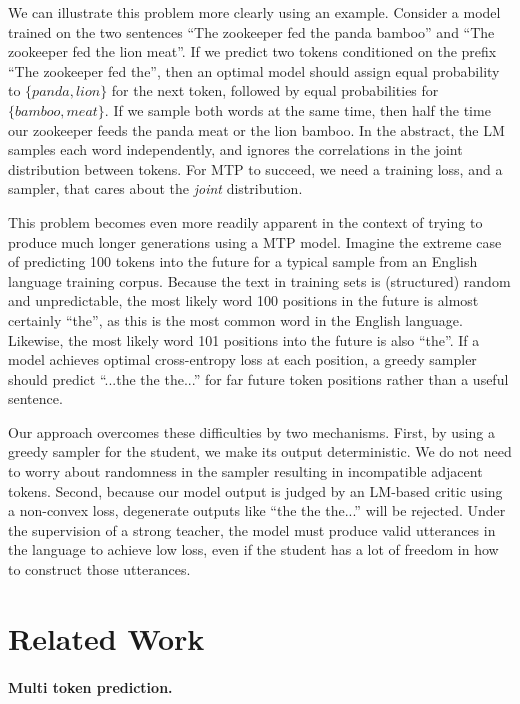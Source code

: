 \documentclass{article}
\theoremstyle{plain}
\theoremstyle{definition}
\theoremstyle{remark}
\begin{document}
We can illustrate this problem more clearly using an example. Consider a model trained on the two sentences ``The zookeeper fed the panda bamboo'' and ``The zookeeper fed the lion meat''. If we predict two tokens conditioned on the prefix ``The zookeeper fed the'', then an optimal model should assign equal probability to $\{panda, lion\}$ for the next token, followed by equal probabilities for $\{bamboo, meat\}$.  If we sample both words at the same time, then half the time our zookeeper  feeds the panda meat or the lion bamboo. In the abstract, the LM samples each word independently, and ignores the correlations in the joint distribution between tokens.  For MTP to succeed, we need a training loss, and a sampler, that cares about the {\em joint} distribution.

This problem becomes even more readily apparent in the context of trying to produce much longer generations using a MTP model.
Imagine the extreme case of predicting 100 tokens into the future for a typical sample from an English language training corpus.  Because the text in training sets is (structured) random and unpredictable, the most likely word 100 positions in the future is almost certainly ``the'', as this is the most common word in the English language. Likewise, the most likely word 101 positions into the future is also ``the''. If a model achieves optimal cross-entropy loss at each position, a greedy sampler should predict ``...the the the...'' for far future token positions rather than a useful sentence.  

Our approach overcomes these difficulties by two mechanisms.  First, by using a greedy sampler for the student, we make its output deterministic. We do not need to worry about randomness in the sampler resulting in incompatible adjacent tokens.  Second, because our model output is judged by an LM-based critic using a non-convex loss, degenerate outputs like ``the the the...'' will be rejected.  Under the supervision of a strong teacher, the model must produce valid utterances in the language to achieve low loss, even if the student has a lot of freedom in how to construct those utterances.


\section{Related Work} 

\paragraph{Multi token prediction.}\label{sec:rel-mtp}
\end{document}
